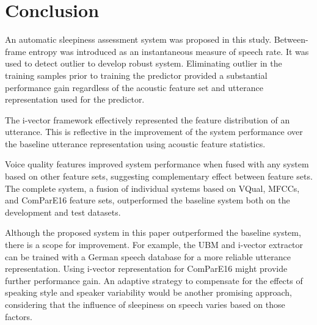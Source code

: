 \section{Conclusion}

An automatic sleepiness assessment system was proposed in this study. Between-frame entropy was introduced as an instantaneous measure of speech rate. It was used to detect outlier to develop robust system. Eliminating outlier in the training samples prior to training the predictor provided a substantial performance gain regardless of the acoustic feature set and utterance representation used for the predictor.

The i-vector framework effectively represented the feature distribution of an utterance. This is reflective in the improvement of the system performance over the baseline utterance representation using acoustic feature statistics. 

Voice quality features improved system performance when fused with any system based on other feature sets, suggesting complementary effect between feature sets.
The complete system, a fusion of individual systems based on VQual, MFCCs, and ComParE16 feature sets, outperformed the baseline system both on the development and test datasets.




Although the proposed system in this paper outperformed the baseline system, there is a scope for improvement. For example, the UBM and i-vector extractor can be trained with a German speech database for a more reliable utterance representation. Using i-vector representation for ComParE16 might provide further performance gain.
An adaptive strategy to compensate for the effects of speaking style and speaker variability would be another promising approach, considering that the influence of sleepiness on speech varies based on those factors.



